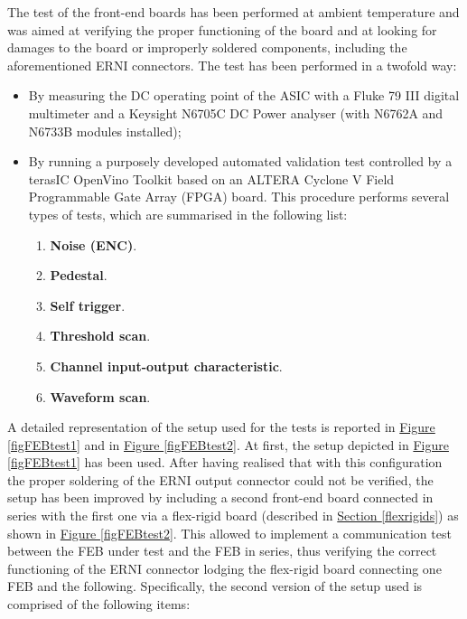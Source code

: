 \par

\par
The test of the front-end boards has been performed at ambient temperature and was aimed at verifying the proper functioning of the board and at looking for damages to the board or improperly soldered components, including the aforementioned ERNI connectors. The test has been performed in a twofold way:

\begin{itemize}
    \itemsep0em 
    \item By measuring the DC operating point of the ASIC with a Fluke 79 III digital multimeter and a Keysight N6705C DC Power analyser (with N6762A and N6733B modules installed);
    \item By running a purposely developed automated validation test controlled by a terasIC OpenVino Toolkit based on an ALTERA Cyclone V Field Programmable Gate Array (FPGA) board. This procedure performs several types of tests, which are summarised in the following list:
    
    \begin{enumerate}
        \itemsep0em 
        \item \textbf{Noise (ENC)}.
        \item \textbf{Pedestal}.
        \item \textbf{Self trigger}.
        \item \textbf{Threshold scan}.
        \item \textbf{Channel input-output characteristic}.
        \item \textbf{Waveform scan}.
    \end{enumerate}
\end{itemize}

\par
A detailed representation of the setup used for the tests is reported in \hyperref[figFEBtest1]{Figure \ref{figFEBtest1}} and in \hyperref[figFEBtest2]{Figure \ref{figFEBtest2}}. At first, the setup depicted in \hyperref[figFEBtest1]{Figure \ref{figFEBtest1}} has been used. After having realised that with this configuration the proper soldering of the ERNI output connector could not be verified, the setup has been improved by including a second front-end board connected in series with the first one via a flex-rigid board (described in \hyperref[flexrigids]{Section \ref{flexrigids}}) as shown in \hyperref[figFEBtest2]{Figure \ref{figFEBtest2}}. This allowed to implement a communication test between the FEB under test and the FEB in series, thus verifying the correct functioning of the ERNI connector lodging the flex-rigid board connecting one FEB and the following. Specifically, the second version of the setup used is comprised of the following items:

